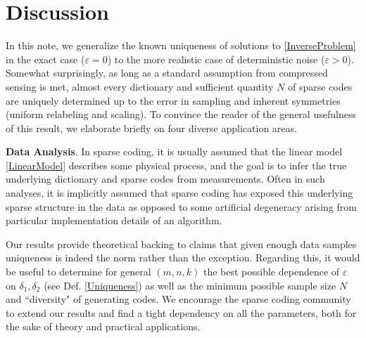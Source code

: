 \documentclass[journal, twocolumn]{IEEEtran}
\begin{document}


\section{Discussion}\label{Discussion}

In this note, we generalize the known uniqueness of solutions to \eqref{InverseProblem} in the exact case ($\varepsilon = 0$) to the more realistic case of deterministic noise ($\varepsilon > 0$).  Somewhat surprisingly, as long as a standard assumption from compressed sensing is met, almost every dictionary and sufficient quantity $N$ of sparse codes are uniquely determined up to the error in sampling and inherent symmetries (uniform relabeling and scaling). To convince the reader of the general usefulness of this result, we elaborate briefly on four diverse application areas.


\textbf{Data Analysis}.  
In sparse coding, it is usually assumed that the linear model \eqref{LinearModel} describes some physical process, and the goal is to infer the true underlying dictionary and sparse codes from measurements. Often in such analyses, it is implicitly assumed that sparse coding has exposed this underlying sparse structure in the data as opposed to some artificial degeneracy arising from particular implementation details of an algorithm. 

Our results provide theoretical backing to claims that given enough data samples uniqueness is indeed the norm rather than the exception. Regarding this, it would be useful to determine for general $(m,n,k)$ the best possible dependence of $\varepsilon$ on $\delta_1, \delta_2$ (see Def. \ref{Uniqueness}) as well as the minimum possible sample size $N$ and ``diversity" of generating codes. We encourage the sparse coding community to extend our results and find a tight dependency on all the parameters, both for the sake of theory and practical applications.
\end{document}
